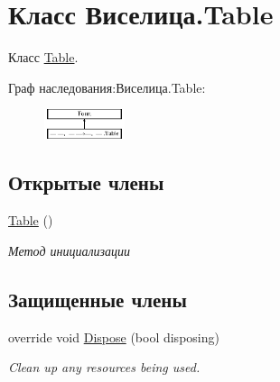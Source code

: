 \hypertarget{class_xD0_x92_xD0_xB8_xD1_x81_xD0_xB5_xD0_xBB_xD0_xB8_xD1_x86_xD0_xB0_1_1_table}{\section{Класс Виселица.\+Table}
\label{class_xD0_x92_xD0_xB8_xD1_x81_xD0_xB5_xD0_xBB_xD0_xB8_xD1_x86_xD0_xB0_1_1_table}
}


Класс \hyperlink{class_xD0_x92_xD0_xB8_xD1_x81_xD0_xB5_xD0_xBB_xD0_xB8_xD1_x86_xD0_xB0_1_1_table}{Table}.  


Граф наследования\+:Виселица.\+Table\+:\begin{figure}[H]
\begin{center}
\leavevmode
\includegraphics[height=0.877743cm]{class_xD0_x92_xD0_xB8_xD1_x81_xD0_xB5_xD0_xBB_xD0_xB8_xD1_x86_xD0_xB0_1_1_table}
\end{center}
\end{figure}
\subsection*{Открытые члены}
\begin{DoxyCompactItemize}
\item 
\hyperlink{class_xD0_x92_xD0_xB8_xD1_x81_xD0_xB5_xD0_xBB_xD0_xB8_xD1_x86_xD0_xB0_1_1_table_a8651db4598c9bba5f032b60b31881556}{Table} ()
\begin{DoxyCompactList}\small\item\em Метод инициализации \end{DoxyCompactList}\end{DoxyCompactItemize}
\subsection*{Защищенные члены}
\begin{DoxyCompactItemize}
\item 
override void \hyperlink{class_xD0_x92_xD0_xB8_xD1_x81_xD0_xB5_xD0_xBB_xD0_xB8_xD1_x86_xD0_xB0_1_1_table_a4e7df17f00af02118c3a3046aa270a48}{Dispose} (bool disposing)
\begin{DoxyCompactList}\small\item\em Clean up any resources being used. \end{DoxyCompactList}\end{DoxyCompactItemize}


